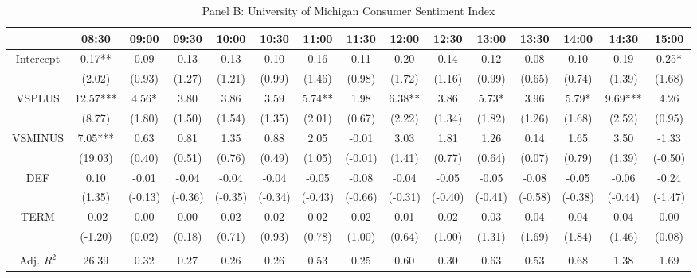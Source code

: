 \begin{table}[h]
\begin{threeparttable}
\begin{subtable}[t]{\linewidth}
\caption{Panel B: University of Michigan Consumer Sentiment Index}
\tiny
\begin{tabular}{ccccccccccccccc}
\toprule
                & 08:30    & 09:00   & 09:30   & 10:00   & 10:30   & 11:00   & 11:30   & 12:00   & 12:30   & 13:00   & 13:30   & 14:00   & 14:30   & 15:00   \\ \midrule
Intercept       & 0.17**   & 0.09    & 0.13    & 0.13    & 0.10    & 0.16    & 0.11    & 0.20    & 0.14    & 0.12    & 0.08    & 0.10    & 0.19    & 0.25*   \\
                & (2.02)   & (0.93)  & (1.27)  & (1.21)  & (0.99)  & (1.46)  & (0.98)  & (1.72)  & (1.16)  & (0.99)  & (0.65)  & (0.74)  & (1.39)  & (1.68)  \\
VSPLUS          & 12.57*** & 4.56*   & 3.80    & 3.86    & 3.59    & 5.74**  & 1.98    & 6.38**  & 3.86    & 5.73*   & 3.96    & 5.79*   & 9.69*** & 4.26    \\
                & (8.77)   & (1.80)  & (1.50)  & (1.54)  & (1.35)  & (2.01)  & (0.67)  & (2.22)  & (1.34)  & (1.82)  & (1.26)  & (1.68)  & (2.52)  & (0.95)  \\
VSMINUS         & 7.05***  & 0.63    & 0.81    & 1.35    & 0.88    & 2.05    & -0.01   & 3.03    & 1.81    & 1.26    & 0.14    & 1.65    & 3.50    & -1.33   \\
                & (19.03)  & (0.40)  & (0.51)  & (0.76)  & (0.49)  & (1.05)  & (-0.01) & (1.41)  & (0.77)  & (0.64)  & (0.07)  & (0.79)  & (1.39)  & (-0.50) \\
DEF             & 0.10     & -0.01   & -0.04   & -0.04   & -0.04   & -0.05   & -0.08   & -0.04   & -0.05   & -0.05   & -0.08   & -0.05   & -0.06   & -0.24   \\
                & (1.35)   & (-0.13) & (-0.36) & (-0.35) & (-0.34) & (-0.43) & (-0.66) & (-0.31) & (-0.40) & (-0.41) & (-0.58) & (-0.38) & (-0.44) & (-1.47) \\
TERM            & -0.02    & 0.00    & 0.00    & 0.02    & 0.02    & 0.02    & 0.02    & 0.01    & 0.02    & 0.03    & 0.04    & 0.04    & 0.04    & 0.00    \\
                & (-1.20)  & (0.02)  & (0.18)  & (0.71)  & (0.93)  & (0.78)  & (1.00)  & (0.64)  & (1.00)  & (1.31)  & (1.69)  & (1.84)  & (1.46)  & (0.08)  \\
                &          &         &         &         &         &         &         &         &         &         &         &         &         &         \\
 Adj. $R^{2}$  & 26.39    & 0.32    & 0.27    & 0.26    & 0.26    & 0.53    & 0.25    & 0.60    & 0.30    & 0.63    & 0.53    & 0.68    & 1.38    & 1.69     \\ 
\bottomrule
\end{tabular}


\end{subtable}
\end{threeparttable}
\end{table}
